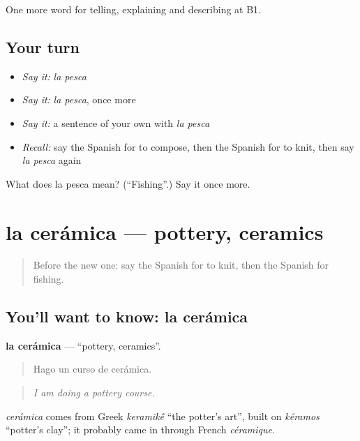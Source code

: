 \begin{grammarlens}[title={What you've built}]
One more word for telling, explaining and describing at B1.
\end{grammarlens}

\subsection*{Your turn}
\begin{itemize}
\raggedright
  \item \emph{Say it:} \emph{la pesca}
  \item \emph{Say it:} \emph{la pesca}, once more
  \item \emph{Say it:} a sentence of your own with \emph{la pesca}
  \item \emph{Recall:} say the Spanish for to compose, then the Spanish for to knit, then say \emph{la pesca} again
\end{itemize}

\begin{tcolorbox}[breakable,colback=teal!4,colframe=teal!35!black,title={Before you move on}]
What does la pesca mean? (\textquotedblleft{}Fishing\textquotedblright{}.) Say it once more.
\end{tcolorbox}
\section[la cerámica]{la cerámica — pottery, ceramics}

\label{lesson:ES-C754-ceramica}



\begin{quote}
Before the new one: say the Spanish for to knit, then the Spanish for fishing.
\end{quote}

\subsection*{You'll want to know: la cerámica}
\textbf{la cerámica} — \textquotedblleft{}pottery, ceramics\textquotedblright{}.

\begin{quote}
Hago un curso de cerámica.
\end{quote}

\begin{quote}
\emph{I am doing a pottery course.}
\end{quote}

\begin{cousinweb}
\emph{cerámica} comes from Greek \emph{keramik\'{\={e}}} \textquotedblleft{}the potter's art\textquotedblright{}, built on \emph{kéramos} \textquotedblleft{}potter's clay\textquotedblright{}; it probably came in through French \emph{céramique}.
\end{cousinweb}

